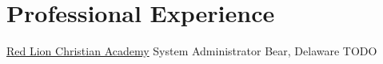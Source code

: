 \section{Professional Experience}
		{\href{http://redlionca.org}{Red Lion Christian Academy}}
		{System Administrator}
		{Bear, Delaware}{}
		{TODO}

